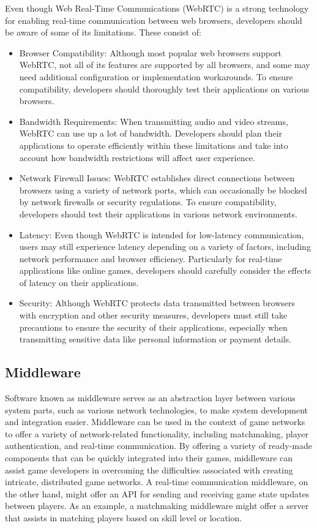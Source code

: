 Even though Web Real-Time Communications (WebRTC) is a strong technology for enabling real-time communication between web browsers, developers should be aware of some of its limitations. These consist of:
\begin{itemize}
    \item Browser Compatibility: Although most popular web browsers support WebRTC, not all of its features are supported by all browsers, and some may need additional configuration or implementation workarounds. To ensure compatibility, developers should thoroughly test their applications on various browsers.\cite{webrtcgamingmatch}
    \item Bandwidth Requirements: When transmitting audio and video streams, WebRTC can use up a lot of bandwidth. Developers should plan their applications to operate efficiently within these limitations and take into account how bandwidth restrictions will affect user experience.\cite{webrtc}
    \item Network Firewall Issues: WebRTC establishes direct connections between browsers using a variety of network ports, which can occasionally be blocked by network firewalls or security regulations. To ensure compatibility, developers should test their applications in various network environments.\cite{webrtc}
    \item Latency: Even though WebRTC is intended for low-latency communication, users may still experience latency depending on a variety of factors, including network performance and browser efficiency. Particularly for real-time applications like online games, developers should carefully consider the effects of latency on their applications.\cite{webrtcgamingmatch}
    \item Security: Although WebRTC protects data transmitted between browsers with encryption and other security measures, developers must still take precautions to ensure the security of their applications, especially when transmitting sensitive data like personal information or payment details.
\end{itemize}\cite{webrtcrealtimegaming}

\subsection{Middleware}
Software known as middleware serves as an abstraction layer between various system parts, such as various network technologies, to make system development and integration easier. Middleware can be used in the context of game networks to offer a variety of network-related functionality, including matchmaking, player authentication, and real-time communication.\cite{gamemiddleware}
By offering a variety of ready-made components that can be quickly integrated into their games, middleware can assist game developers in overcoming the difficulties associated with creating intricate, distributed game networks. A real-time communication middleware, on the other hand, might offer an API for sending and receiving game state updates between players. As an example, a matchmaking middleware might offer a server that assists in matching players based on skill level or location.\cite{gamenetworkmiddleware}

